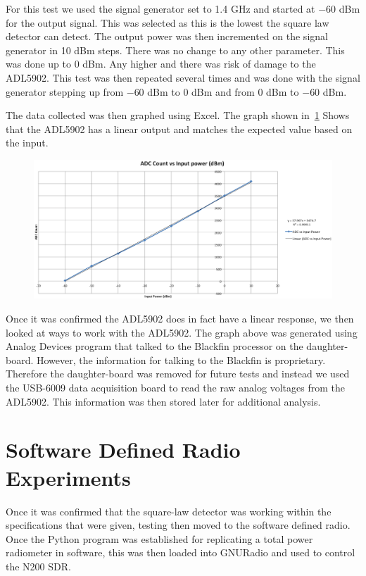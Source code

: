 For this test we used the signal generator set to 1.4 GHz and started at $-60$ dBm for the output signal.  This was selected as this is the lowest the square law detector can detect.  The output power was then incremented on the signal generator in 10 dBm steps.  There was no change to any other parameter.  This was done up to 0 dBm.  Any higher and there was risk of damage to the ADL5902.  This test was then repeated several times and was done with the signal generator stepping up from $-60$ dBm to 0 dBm and from 0 dBm to $-60$ dBm.  

The data collected was then graphed using Excel.  The graph shown in~\ref{adl5902_linear}
Shows that the ADL5902 has a linear output and matches the expected value based on the input.  

\begin{figure}[h!tb] \centering

\includegraphics[width=\textwidth]{Images/Linearsquarelaw}

\label{adl5902_linear}
\end{figure}

Once it was confirmed the ADL5902 does in fact have a linear response, we then looked at ways to work with the ADL5902.  The graph above was generated using Analog Devices program that talked to the Blackfin processor on the daughter-board.  However, the information for talking to the Blackfin is proprietary.  Therefore the daughter-board was removed for future tests and instead we used the USB-6009 data acquisition board to read the raw analog voltages from the ADL5902.  This information was then stored later for additional analysis.  

\section{Software Defined Radio Experiments}
Once it was confirmed that the square-law detector was working within the specifications that were given, testing then moved to the software defined radio.  Once the Python program was established for replicating a total power radiometer in software, this was then loaded into GNURadio and used to control the N200 SDR.  

